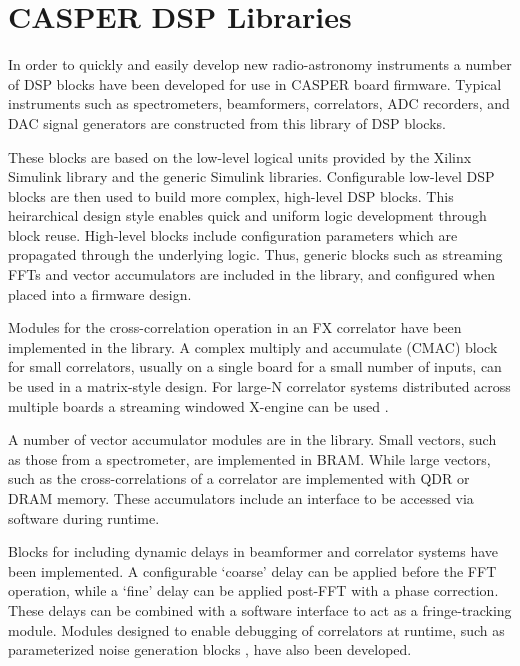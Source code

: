\documentclass{ws-jai}
\begin{document}
\section{CASPER DSP Libraries} \label{sec:libraries}



In order to quickly and easily develop new radio-astronomy instruments a number
of DSP blocks have been developed for use in CASPER board firmware. Typical
instruments such as spectrometers, beamformers, correlators, ADC recorders, and
DAC signal generators are constructed from this library of DSP blocks.

These blocks are based on the low-level logical units provided by the Xilinx
Simulink library and the generic Simulink libraries. Configurable low-level DSP
blocks are then used to build more complex, high-level DSP blocks. This
heirarchical design style enables quick and uniform logic development through
block reuse. High-level blocks include configuration parameters which are
propagated through the underlying logic. Thus,
generic blocks such as streaming FFTs and vector accumulators are included in
the library, and configured when placed into a firmware design.

Modules for the cross-correlation operation in an FX correlator have been
implemented in the library. A complex multiply and accumulate (CMAC) block for
small correlators, usually on a single board for a small number of inputs, can
be used in a matrix-style design. For large-N correlator systems distributed
across multiple boards a streaming windowed X-engine can be used \citep{parsons2008scalable, hickish14}.

A number of vector accumulator modules are in the library.
Small vectors, such as those from a spectrometer, are implemented in BRAM. While
large vectors, such as the cross-correlations of a correlator are implemented
with QDR or DRAM memory. These accumulators include an interface to be accessed
via software during runtime.

Blocks for including dynamic delays in beamformer and correlator systems have
been implemented. A configurable `coarse' delay can be applied before the FFT
operation, while a `fine' delay can be applied post-FFT with a phase correction.
These delays can be combined with a software interface to act as a fringe-tracking module. Modules designed to enable debugging of correlators at runtime,
such as parameterized noise generation blocks \citep{noisegen}, have also been developed.
\end{document}
